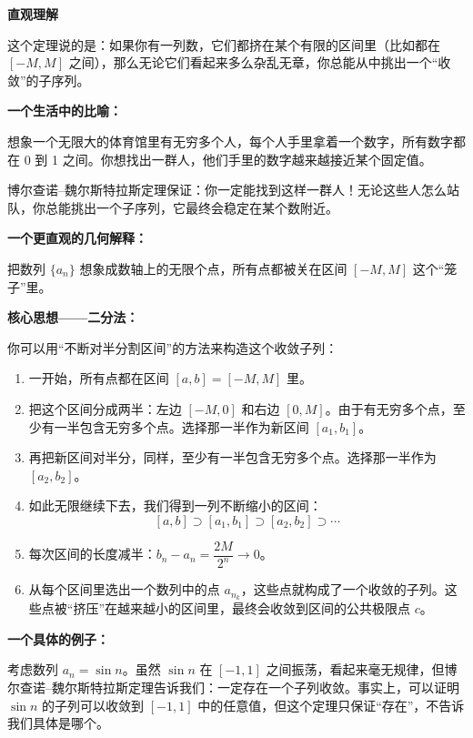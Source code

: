 \documentclass[fontset=fandol]{ctexart}
\newenvironment{intuition}{\par\noindent\textbf{直观理解}\quad}{\par\vspace{0.8em}}
\begin{document}
\begin{intuition}

这个定理说的是：如果你有一列数，它们都挤在某个有限的区间里（比如都在 \([-M, M]\) 之间），那么无论它们看起来多么杂乱无章，你总能从中挑出一个“收敛”的子序列。

\textbf{一个生活中的比喻：}

想象一个无限大的体育馆里有无穷多个人，每个人手里拿着一个数字，所有数字都在 0 到 1 之间。你想找出一群人，他们手里的数字越来越接近某个固定值。

博尔查诺--魏尔斯特拉斯定理保证：你一定能找到这样一群人！无论这些人怎么站队，你总能挑出一个子序列，它最终会稳定在某个数附近。

\textbf{一个更直观的几何解释：}

把数列 \(\{a_n\}\) 想象成数轴上的无限个点，所有点都被关在区间 \([-M, M]\) 这个“笼子”里。

\begin{center}
\end{center}

\textbf{核心思想——二分法：}

你可以用“不断对半分割区间”的方法来构造这个收敛子列：

\begin{enumerate}
\item 一开始，所有点都在区间 \([a, b] = [-M, M]\) 里。
\item 把这个区间分成两半：左边 \([-M, 0]\) 和右边 \([0, M]\)。由于有无穷多个点，至少有一半包含无穷多个点。选择那一半作为新区间 \([a_1, b_1]\)。
\item 再把新区间对半分，同样，至少有一半包含无穷多个点。选择那一半作为 \([a_2, b_2]\)。
\item 如此无限继续下去，我们得到一列不断缩小的区间：
\[
[a, b] \supset [a_1, b_1] \supset [a_2, b_2] \supset \cdots
\]
\item 每次区间的长度减半：\(b_n - a_n = \dfrac{2M}{2^n} \to 0\)。
\item 从每个区间里选出一个数列中的点 \(a_{n_k}\)，这些点就构成了一个收敛的子列。这些点被“挤压”在越来越小的区间里，最终会收敛到区间的公共极限点 \(c\)。
\end{enumerate}

\textbf{一个具体的例子：}

考虑数列 \(a_n = \sin n\)。虽然 \(\sin n\) 在 \([-1, 1]\) 之间振荡，看起来毫无规律，但博尔查诺--魏尔斯特拉斯定理告诉我们：一定存在一个子列收敛。事实上，可以证明 \(\sin n\) 的子列可以收敛到 \([-1, 1]\) 中的任意值，但这个定理只保证“存在”，不告诉我们具体是哪个。

\end{intuition}
\end{document}
